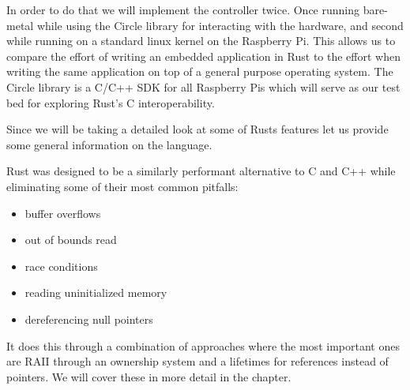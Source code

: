 In order to do that we will implement the controller twice.
Once running bare-metal while using the Circle library for interacting with the hardware,
and second while running on a standard linux kernel on the Raspberry Pi.
This allows us to compare the effort of writing an embedded application in Rust to the effort
when writing the same application on top of a general purpose operating system.
The Circle library is a C/C++ SDK for all Raspberry Pis which will serve as our test bed for exploring Rust's C interoperability.

Since we will be taking a detailed look at some of Rusts features let us provide some general information on the language.

Rust was designed to be a similarly performant alternative to C and C++ while eliminating some of their most common pitfalls:
\begin{itemize}
    \item buffer overflows
    \item out of bounds read
    \item race conditions
    \item reading uninitialized memory
    \item dereferencing null pointers
\end{itemize}

It does this through a combination of approaches where the most important ones are RAII through an ownership system and a lifetimes for references instead of pointers.
We will cover these in more detail in the  chapter.
